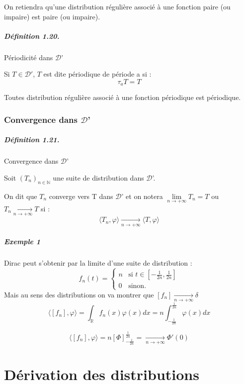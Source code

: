 \documentclass[12pt,a4paper]{report}
\newcommand{\ens}[1]{\mathbb{#1}}
\newcommand{\D}{\ensuremath{\mathcal{D}}}
\begin{document}
On retiendra qu'une distribution régulière associé à une fonction paire (ou impaire) est paire (ou impaire).

\paragraph{Définition 1.20.} Périodicité dans \D'

Si \(T \in \D'\), \(T\) est dite périodique de période a si :
\[
	\tau_a T = T
\]

Toutes distribution régulière associé à une fonction périodique est périodique.

\subsection{Convergence dans \D'}

\paragraph{Définition 1.21.} Convergence dans \D'

Soit \((T_n)_{n\in\ens{N}}\) une suite de distribution dans \D'.

On dit que \(T_n\) converge vers T dans \D' et on notera \(\underset{n \rightarrow +\infty}{\lim} T_n = T\) ou \(T_n \underset{n \rightarrow +\infty}{\rightarrow} T\) si :
\[
	\langle T_n, \varphi \rangle \underset{n \rightarrow +\infty}{\rightarrow} \langle T, \varphi \rangle
\]

\paragraph{Exemple 1} Dirac peut s'obtenir par la limite d'une suite de distribution :
\[
	f_n(t) = \left\{
    \begin{array}{ll}
        n & \mbox{si } t \in [-\frac{1}{2n}, \frac{1}{2n}] \\
        0 & \mbox{sinon.}
    \end{array}
\right.
\]
Mais au sens des distributions on va montrer que \([f_n] \underset{n \rightarrow +\infty}{\rightarrow} \delta\)
\[
	\langle [f_n], \varphi \rangle = \int_{\ens{R}} f_n(x) \varphi(x) dx = n \int_{-\frac{1}{2n}}^{\frac{1}{2n}} \varphi(x) dx
\]

\[
	\langle [f_n], \varphi \rangle = n \left[ \Phi \right]_{-\frac{1}{2n}}^{\frac{1}{2n}} = \underset{n \rightarrow +\infty}{\rightarrow} \Phi' (0)
\]

\chapter{Dérivation des distributions}
\end{document}
